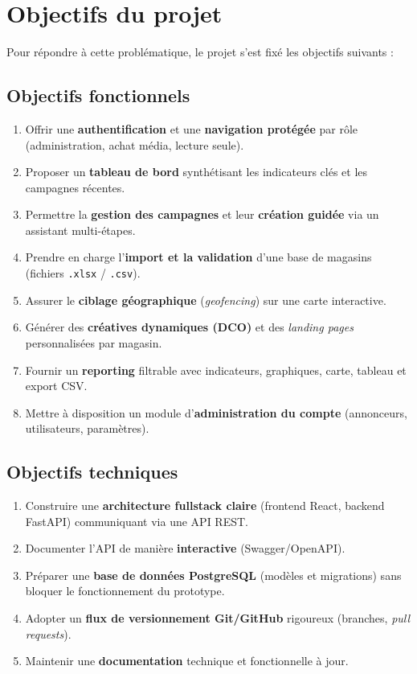 \section{Objectifs du projet}

Pour répondre à cette problématique, le projet s'est fixé les objectifs
suivants :

\subsection{Objectifs fonctionnels}
\begin{enumerate}[label=\textbf{O\arabic*.}]
  \item Offrir une \textbf{authentification} et une \textbf{navigation
        protégée} par rôle (administration, achat média, lecture seule).
  \item Proposer un \textbf{tableau de bord} synthétisant les indicateurs
        clés et les campagnes récentes.
  \item Permettre la \textbf{gestion des campagnes} et leur \textbf{création
        guidée} via un assistant multi-étapes.
  \item Prendre en charge l'\textbf{import et la validation} d'une base de
        magasins (fichiers \texttt{.xlsx} / \texttt{.csv}).
  \item Assurer le \textbf{ciblage géographique} (\emph{geofencing}) sur une
        carte interactive.
  \item Générer des \textbf{créatives dynamiques (DCO)} et des \emph{landing
        pages} personnalisées par magasin.
  \item Fournir un \textbf{reporting} filtrable avec indicateurs, graphiques,
        carte, tableau et export CSV.
  \item Mettre à disposition un module d'\textbf{administration du compte}
        (annonceurs, utilisateurs, paramètres).
\end{enumerate}

\subsection{Objectifs techniques}
\begin{enumerate}[label=\textbf{T\arabic*.}]
  \item Construire une \textbf{architecture fullstack claire} (frontend
        React, backend FastAPI) communiquant via une API REST.
  \item Documenter l'API de manière \textbf{interactive} (Swagger/OpenAPI).
  \item Préparer une \textbf{base de données PostgreSQL} (modèles et
        migrations) sans bloquer le fonctionnement du prototype.
  \item Adopter un \textbf{flux de versionnement Git/GitHub} rigoureux
        (branches, \emph{pull requests}).
  \item Maintenir une \textbf{documentation} technique et fonctionnelle à jour.
\end{enumerate}


